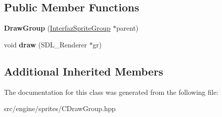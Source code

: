 \subsection*{Public Member Functions}
\begin{DoxyCompactItemize}
\item 
{\bfseries Draw\+Group} (\hyperlink{class_interfaz_sprite_group}{Interfaz\+Sprite\+Group} $\ast$parent)\hypertarget{class_draw_group_a985c396afbae3c1686c2fd65288b7443}{}\label{class_draw_group_a985c396afbae3c1686c2fd65288b7443}

\item 
void {\bfseries draw} (S\+D\+L\+\_\+\+Renderer $\ast$gr)\hypertarget{class_draw_group_ad658a4bc0093f182af2fa41883f99b07}{}\label{class_draw_group_ad658a4bc0093f182af2fa41883f99b07}

\end{DoxyCompactItemize}
\subsection*{Additional Inherited Members}


The documentation for this class was generated from the following file\+:\begin{DoxyCompactItemize}
\item 
src/engine/sprites/C\+Draw\+Group.\+hpp\end{DoxyCompactItemize}
